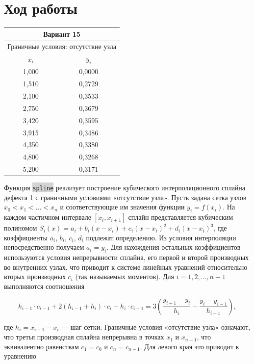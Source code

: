 \documentclass[14pt]{extreport}
\newcommand{\code}[1]{\colorbox{lightgray}{\texttt{#1}}}
\begin{document}
{        \section{Ход работы}
        \begin{table}[h!]
\centering
\begin{tabular}{|c|c|}
\hline
\multicolumn{2}{|c|}{\textbf{Вариант 15}} \\ \hline
\multicolumn{2}{|c|}{Граничные условия: отсутствие узла} \\ \hline
$x_i$ & $y_i$ \\ \hline
1,000 & 0,0000 \\ \hline
1,510 & 0,2729 \\ \hline
2,100 & 0,3533 \\ \hline
2,750 & 0,3679 \\ \hline
3,420 & 0,3595 \\ \hline
3,915 & 0,3486 \\ \hline
4,350 & 0,3380 \\ \hline
4,800 & 0,3268 \\ \hline
5,200 & 0,3171 \\ \hline
\end{tabular}
\end{table}
\code{}

Функция \code{spline} реализует построение кубического интерполяционного сплайна дефекта 1 с граничными условиями «отсутствие узла». Пусть задана сетка узлов $x_0 < x_1 < \ldots < x_n$ и соответствующие им значения функции $y_i = f(x_i)$. На каждом частичном интервале $[x_i, x_{i+1}]$ сплайн представляется кубическим полиномом $S_i(x) = a_i + b_i(x-x_i) + c_i(x-x_i)^2 + d_i(x-x_i)^3$, где коэффициенты $a_i$, $b_i$, $c_i$, $d_i$ подлежат определению. Из условия интерполяции непосредственно получаем $a_i = y_i$. Для нахождения остальных коэффициентов используются условия непрерывности сплайна, его первой и второй производных во внутренних узлах, что приводит к системе линейных уравнений относительно вторых производных $c_i$ (так называемых моментов). Для $i = 1, 2, \ldots, n-1$ выполняются соотношения

\[
h_{i-1} \cdot c_{i-1} + 2(h_{i-1} + h_i) \cdot c_i + h_i \cdot c_{i+1} = 3\left(\frac{y_{i+1}-y_i}{h_i} - \frac{y_i-y_{i-1}}{h_{i-1}}\right),
\]

где $h_i = x_{i+1} - x_i$ — шаг сетки. Граничные условия «отсутствие узла» означают, что третья производная сплайна непрерывна в точках $x_1$ и $x_{n-1}$, что эквивалентно равенствам $c_1 = c_0$ и $c_n = c_{n-1}$. Для левого края это приводит к уравнению

}
\end{document}
